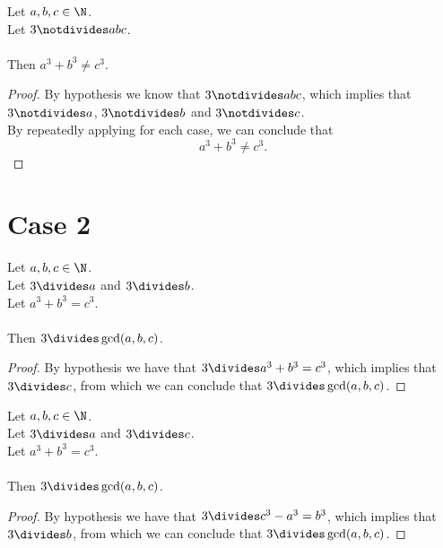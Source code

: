 \begin{theorem}
    \label{thm:fermatLastTheoremThree_case_1}
    \leanok
    Let $a, b, c \in \N$. \\
    Let $3 \notdivides abc$. \\\\
    Then $a ^ 3 + b ^ 3 \neq c ^ 3$.
\end{theorem}
\begin{proof}
  \leanok
  By hypothesis we know that $3 \notdivides abc$, which implies that $3 \notdivides a$, $3 \notdivides b$ and $3 \notdivides c$. \\
  By repeatedly applying  for each case,
  we can conclude that $$a ^ 3 + b ^ 3 \neq c ^ 3.$$
\end{proof}

\section{Case 2}

\begin{lemma}
  \label{lmm:three_dvd_gcd_of_dvd_a_of_dvd_b}
  \leanok
  Let $a, b, c \in \N$. \\
  Let $3 \divides a$ and $3 \divides b$. \\
  Let $a ^ 3 + b ^ 3 = c ^ 3$. \\\\
  Then $3 \divides \gcd(a,b,c)$.
\end{lemma}
\begin{proof}
  \leanok
  By hypothesis we have that $3 \divides a^3 + b^3 = c^3$, which implies that $3 \divides c$,
  from which we can conclude that $3 \divides \gcd(a,b,c)$.
\end{proof}

\begin{lemma}
  \label{lmm:three_dvd_gcd_of_dvd_a_of_dvd_c}
  \leanok
  Let $a, b, c \in \N$. \\
  Let $3 \divides a$ and $3 \divides c$. \\
  Let $a ^ 3 + b ^ 3 = c ^ 3$. \\\\
  Then $3 \divides \gcd(a,b,c)$.
\end{lemma}
\begin{proof}
  \leanok
  By hypothesis we have that $3 \divides c^3 - a^3 = b^3$, which implies that $3 \divides b$,
  from which we can conclude that $3 \divides \gcd(a,b,c)$.
\end{proof}

